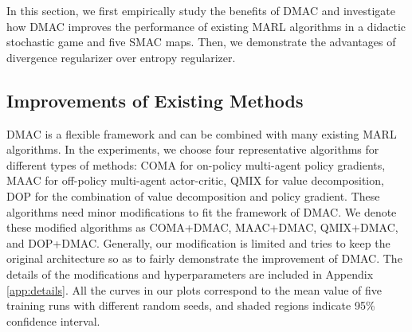 \documentclass{article}
\begin{document}
In this section, we first empirically study the benefits of DMAC and investigate how DMAC improves the performance of existing MARL algorithms in a didactic stochastic game and five SMAC maps. Then, we demonstrate the advantages of divergence regularizer over entropy regularizer. %

\subsection{Improvements of Existing Methods}
DMAC is a flexible framework and can be combined with many existing MARL algorithms. In the experiments, we choose four representative algorithms for different types of methods: COMA \citep{COMA} for on-policy multi-agent policy gradients, MAAC \citep{MAAC} for off-policy multi-agent actor-critic, QMIX \citep{QMIX} for value decomposition, DOP \citep{DOP} for the combination of value decomposition and policy gradient. These algorithms need minor modifications to fit the framework of DMAC. We denote these modified algorithms as COMA+DMAC, MAAC+DMAC,  QMIX+DMAC, and DOP+DMAC. Generally, our modification is limited and tries to keep the original architecture so as to fairly demonstrate the improvement of DMAC. The details of the modifications and hyperparameters are included in Appendix \ref{app:details}. 
All the curves in our plots correspond to the mean value of five training runs with different random seeds, and shaded regions indicate 95\% confidence interval.
\end{document}
